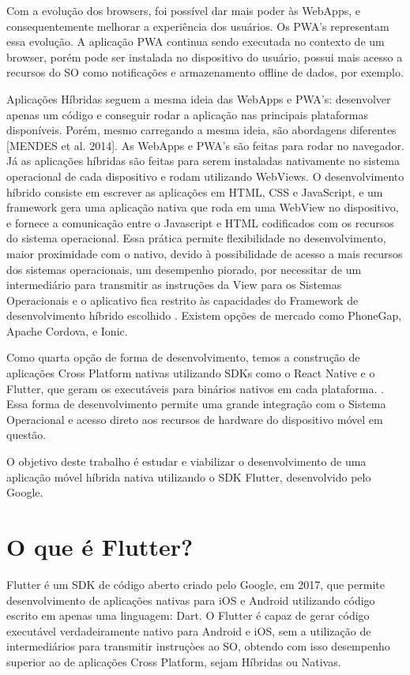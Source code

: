Com a evolução dos browsers, foi possível dar mais poder às WebApps, 
e consequentemente melhorar a experiência dos usuários. 
Os PWA’s representam essa evolução. A aplicação PWA continua sendo 
executada no contexto de um browser, porém pode ser instalada no dispositivo 
do usuário, possui mais acesso a recursos do SO como notificações e armazenamento 
offline de dados, por exemplo.  

Aplicações Híbridas seguem a mesma ideia das WebApps e PWA’s: desenvolver 
apenas um código e conseguir rodar a aplicação nas principais plataformas disponíveis.
Porém, mesmo carregando a mesma ideia, são abordagens diferentes [MENDES et al. 2014].  
As WebApps e PWA’s são feitas para rodar no navegador. 
Já as aplicações híbridas são feitas para serem instaladas nativamente no sistema operacional
 de cada dispositivo e rodam utilizando WebViews. 
   
O desenvolvimento híbrido consiste em escrever as aplicações em HTML, CSS e JavaScript, 
e um framework gera uma aplicação nativa que roda em uma WebView no dispositivo, 
e fornece a comunicação entre o Javascript e HTML codificados com os recursos do sistema operacional.
 Essa prática permite flexibilidade no desenvolvimento, maior proximidade com o nativo, 
 devido à possibilidade de acesso a mais recursos dos sistemas operacionais, 
 um desempenho piorado, por necessitar de um intermediário para transmitir as 
 instruções da View para os Sistemas Operacionais e o aplicativo fica restrito 
 às capacidades do Framework de desenvolvimento híbrido escolhido  .  
 Existem opções de mercado como PhoneGap, Apache Cordova, e Ionic.   

Como quarta opção de forma de desenvolvimento, temos a construção de aplicações
 Cross Platform nativas utilizando SDKs como o React Native e o Flutter, 
 que geram os executáveis para binários nativos em cada plataforma. 
  . 
Essa forma de desenvolvimento permite uma grande integração com o 
Sistema Operacional e acesso direto aos recursos de hardware do dispositivo móvel em questão.

O objetivo deste trabalho é estudar e viabilizar o desenvolvimento de 
uma aplicação móvel híbrida nativa utilizando o SDK Flutter, desenvolvido pelo Google.

\section{O que é Flutter?}
\label{sec:whatisflutter}
Flutter é um SDK de código aberto criado pelo Google, em 2017, 
que permite desenvolvimento de aplicações nativas para iOS e Android 
utilizando código escrito em apenas uma linguagem: Dart. 
O Flutter é capaz de gerar código executável verdadeiramente nativo para Android e iOS, 
sem a utilização de intermediários para transmitir instruçòes ao SO, 
obtendo com isso desempenho superior ao de aplicações Cross Platform, sejam Híbridas ou Nativas. 
 

